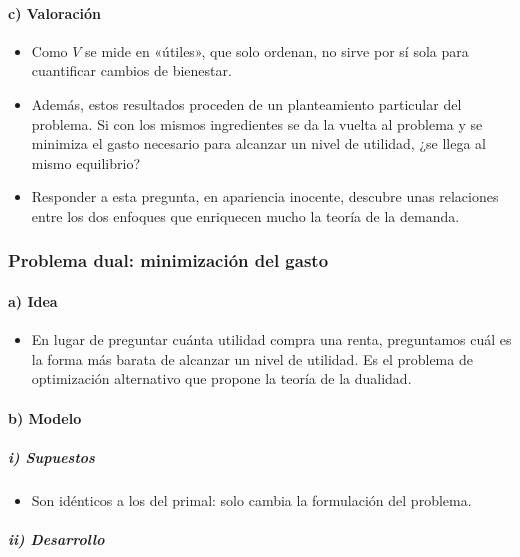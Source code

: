 \documentclass[11pt]{article}
\begin{document}
\paragraph{c) Valoración}

\begin{itemize}
\item Como $V$ se mide en «útiles», que solo ordenan, no sirve por sí sola para cuantificar cambios de bienestar.
\item Además, estos resultados proceden de un planteamiento particular del problema. Si con los mismos ingredientes se da la vuelta al problema y se minimiza el gasto necesario para alcanzar un nivel de utilidad, ¿se llega al mismo equilibrio?
\item Responder a esta pregunta, en apariencia inocente, descubre unas relaciones entre los dos enfoques que enriquecen mucho la teoría de la demanda.
\end{itemize}

\subsubsection{Problema dual: minimización del gasto}\label{sec:problema-dual-minimizacion}

\paragraph{a) Idea}

\begin{itemize}
\item En lugar de preguntar cuánta utilidad compra una renta, preguntamos cuál es la forma más barata de alcanzar un nivel de utilidad. Es el problema de optimización alternativo que propone la teoría de la dualidad.
\end{itemize}

\paragraph{b) Modelo}

\subparagraph{i) Supuestos}

\begin{itemize}
\item Son idénticos a los del primal: solo cambia la formulación del problema.
\end{itemize}

\subparagraph{ii) Desarrollo}
\end{document}
